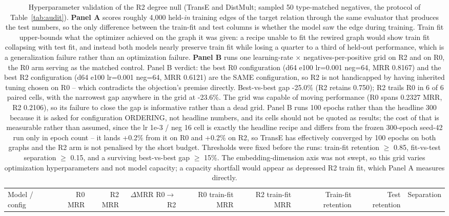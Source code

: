 \begin{table}[H]
\centering
\caption{Hyperparameter validation of the R2 degree null (TransE and DistMult; sampled 50 type-matched negatives, the protocol of Table~\ref{tab:audit}). \textbf{Panel A} scores roughly 4,000 held-\emph{in} training edges of the target relation through the same evaluator that produces the test numbers, so the only difference between the train-fit and test columns is whether the model saw the edge during training. Train fit upper-bounds what the optimizer achieved on the graph it was given: a recipe unable to fit the rewired graph would show train fit collapsing with test fit, and instead both models nearly preserve train fit while losing a quarter to a third of held-out performance, which is a generalization failure rather than an optimization failure. \textbf{Panel B} runs one learning-rate $\times$ negatives-per-positive grid on R2 and on R0, the R0 arm serving as the matched control. Panel B verdict: the best R0 configuration (d64 e100 lr=0.001 neg=64, MRR 0.8167) and the best R2 configuration (d64 e100 lr=0.001 neg=64, MRR 0.6121) are the SAME configuration, so R2 is not handicapped by having inherited tuning chosen on R0 -- which contradicts the objection's premise directly. Best-vs-best gap -25.0\% (R2 retains 0.750); R2 trails R0 in 6 of 6 paired cells, with the narrowest gap anywhere in the grid at -23.6\%. The grid was capable of moving performance (R0 spans 0.2327 MRR, R2 0.2106), so its failure to close the gap is informative rather than a dead grid. Panel B runs 100 epochs rather than the headline 300 because it is asked for configuration ORDERING, not headline numbers, and its cells should not be quoted as results; the cost of that is measurable rather than assumed, since the lr 1e-3 / neg 16 cell is exactly the headline recipe and differs from the frozen 300-epoch seed-42 run only in epoch count -- it lands +0.2\% from it on R0 and +0.2\% on R2, so TransE has effectively converged by 100 epochs on both graphs and the R2 arm is not penalised by the short budget. Thresholds were fixed before the runs: train-fit retention $\geq$ 0.85, fit-vs-test separation $\geq$ 0.15, and a surviving best-vs-best gap $\geq$ 15\%. The embedding-dimension axis was not swept, so this grid varies optimization hyperparameters and not model capacity; a capacity shortfall would appear as depressed R2 train fit, which Panel A measures directly.}
\label{tab:r2_sweep}
\begin{tabular}{lrrrrrrrr}
\toprule
Model / config & R0 MRR & R2 MRR & $\Delta$MRR R0$\to$R2 & R0 train-fit MRR & R2 train-fit MRR & Train-fit retention & Test retention & Separation \\

\end{tabular}
\end{table}
